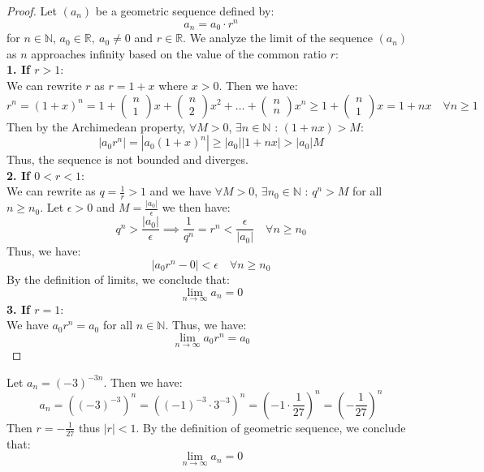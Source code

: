 \begin{proof}
    Let \( (a_n) \) be a geometric sequence defined by:
    \[
        a_n = a_0 \cdot r^{n}
    \]
    for \( n \in \mathbb{N} \), \( a_0 \in \mathbb{R}, \ a_0 \neq 0\) and \( r \in \mathbb{R} \). We analyze the limit of the sequence \( (a_n) \) as \( n \) approaches infinity based on the value of the common ratio \( r \): \\
    \textbf{1. If $r > 1$}: \\
    We can rewrite \( r \) as \( r = 1 + x \) where \( x > 0 \). Then we have:
    \[
        r^n = (1 + x)^n = 1 + \begin{pmatrix}
            n \\ 1
        \end{pmatrix}x + \begin{pmatrix}
            n \\ 2
        \end{pmatrix}x^2 + \ldots + \begin{pmatrix}
            n \\ n
        \end{pmatrix}x^n \geq 1 + \begin{pmatrix}
            n \\ 1
        \end{pmatrix}x = 1 + nx \quad \forall n \geq 1
    \]
    Then by the Archimedean property, $\forall M > 0$, $\exists n \in \mathbb{N}$ : $(1 + nx) > M$:
    \[
        |a_0r^n| = |a_0(1+x)^n| \geq |a_0||1 + nx| > |a_0|M
    \]
    Thus, the sequence is not bounded and diverges. \\
    \textbf{2. If $0 < r < 1$}: \\
    We can rewrite as \( q = \frac{1}{r} > 1 \) and we have $\forall M > 0$, $\exists n_0 \in \mathbb{N}$ : $q^n > M$ for all $n \geq n_0$. Let $\epsilon > 0$ and $M = \frac{|a_0|}{\epsilon}$ we then have:
    \[
        q^n > \frac{|a_0|}{\epsilon} \implies \frac{1}{q^n} = r^n < \frac{\epsilon}{|a_0|} \quad \forall n \geq n_0
    \]
    Thus, we have:
    \[
        |a_0 r^n - 0| < \epsilon \quad \forall n \geq n_0
    \]
    By the definition of limits, we conclude that:
    \[ \lim_{n \to \infty} a_n = 0 \]
    \textbf{3. If $r = 1$}: \\
    We have $a_0 r^n = a_0$ for all $n \in \mathbb{N}$. Thus, we have:
    \[
        \lim_{n \to \infty} a_0 r^n = a_0
    \]
\end{proof}

\begin{eg}
    Let $a_n = (-3)^{-3n}$. Then we have:
    \[ a_n = ((-3)^{-3})^n = ((-1)^{-3} \cdot 3^{-3})^n = (-1 \cdot \frac{1}{27})^n = (-\frac{1}{27})^n \]
    Then $r = -\frac{1}{27}$ thus $|r| < 1$. By the definition of geometric sequence, we conclude that:
    \[ \lim_{n \to \infty} a_n = 0 \]
\end{eg}

